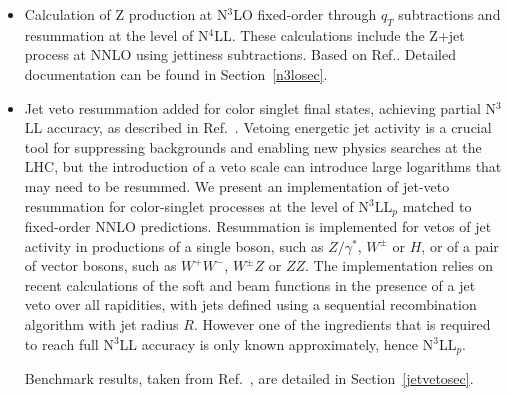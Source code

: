 \label{sec:10x3}
\begin{itemize}
\item 
Calculation of Z production at N$^3$LO fixed-order through $q_T$ subtractions and resummation at 
the level of N$^4$LL. These calculations include the Z+jet process at NNLO using jettiness 
subtractions. Based on Ref.\cite{Neumann:2022lft}. Detailed documentation can be found in 
Section~\ref{n3losec}.

\item
Jet veto resummation added for color singlet final states, achieving
partial {\mbox{N$^3$LL}} accuracy, as described in Ref.~\cite{CENS}.
Vetoing energetic jet activity is a crucial tool for suppressing
backgrounds and enabling new physics searches at the LHC, but the
introduction of a veto scale can introduce large logarithms that may
need to be resummed.  We present an implementation of jet-veto
resummation for color-singlet processes at the level of N$^3$LL$_p$
matched to fixed-order NNLO predictions.  Resummation is
implemented for vetos of jet activity in productions of a single
boson, such as $Z/\gamma^*$, $W^\pm$ or $H$, or of a pair of vector
bosons, such as $W^+W^-$, $W^\pm Z$ or $ZZ$.  The implementation
relies on recent calculations of the soft and beam functions in the
presence of a jet veto over all rapidities, with jets defined using a
sequential recombination algorithm with jet radius $R$.  However one
of the ingredients that is required to reach full {N$^3$LL} accuracy is
only known approximately, hence N$^{3}$LL$_p$.

Benchmark results, taken from Ref.~\cite{CENS}, are
detailed in Section~\ref{jetvetosec}.
\end{itemize}
